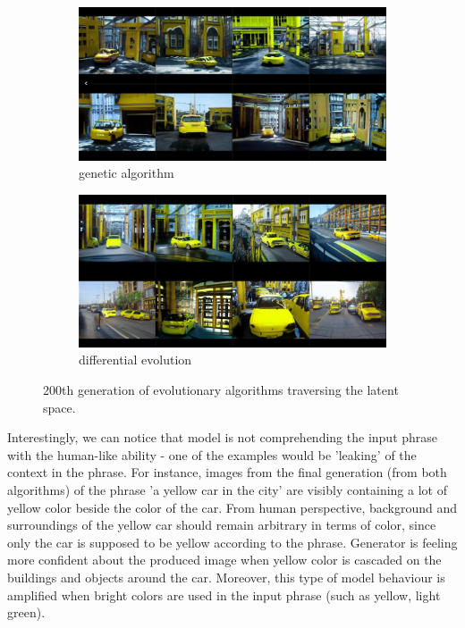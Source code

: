 \documentclass[12pt,a4paper,openany]{book}
\begin{document}
\begin{figure}[H]
\centering
\begin{subfigure}[b]{1.0\textwidth}
   \includegraphics[width=1\linewidth]{GA_yellowcar_200.PNG}
   \caption{genetic algorithm}
   \label{fig:Ng1} 
\end{subfigure}

\begin{subfigure}[b]{1.0\textwidth}
   \includegraphics[width=1\linewidth]{DE_yellowcar_200.PNG}
   \caption{differential evolution}
   \label{fig:Ng2}
\end{subfigure}

\caption[Two numerical solutions]{200th generation of evolutionary algorithms traversing the latent space.}
\end{figure}

Interestingly, we can notice that model is not comprehending the input phrase with the human-like ability - one of the examples would be 'leaking' of the context in the phrase. For instance, images from the final generation (from both algorithms) of the phrase 'a yellow car in the city' are visibly containing a lot of yellow color beside the color of the car. From human perspective, background and surroundings of the yellow car should remain arbitrary in terms of color, since only the car is supposed to be yellow according to the phrase. Generator is feeling more confident about the produced image when yellow color is cascaded on the buildings and objects around the car. Moreover, this type of model behaviour is amplified when bright colors are used in the input phrase (such as yellow, light green).
\end{document}
